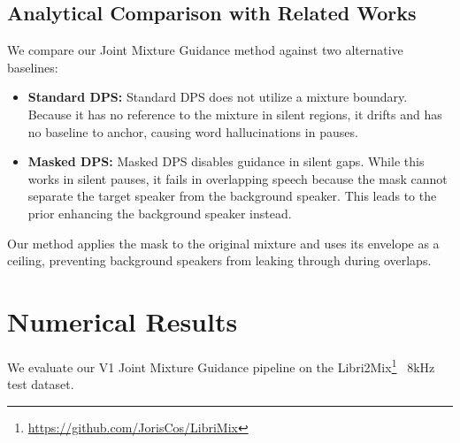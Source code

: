 \documentclass[conference]{IEEEtran}
\begin{document}
\subsection{Analytical Comparison with Related Works}
We compare our Joint Mixture Guidance method against two alternative baselines:
\begin{itemize}
    \item \textbf{Standard DPS:} Standard DPS does not utilize a mixture boundary. Because it has no reference to the mixture in silent regions, it drifts and has no baseline to anchor, causing word hallucinations in pauses.
    \item \textbf{Masked DPS:} Masked DPS disables guidance in silent gaps. While this works in silent pauses, it fails in overlapping speech because the mask cannot separate the target speaker from the background speaker. This leads to the prior enhancing the background speaker instead.
\end{itemize}
Our method applies the mask to the original mixture and uses its envelope as a ceiling, preventing background speakers from leaking through during overlaps.

\section{Numerical Results}
We evaluate our V1 Joint Mixture Guidance pipeline on the Libri2Mix\footnote{\url{https://github.com/JorisCos/LibriMix}}~\cite{librimix} 8kHz test dataset. 
\end{document}
